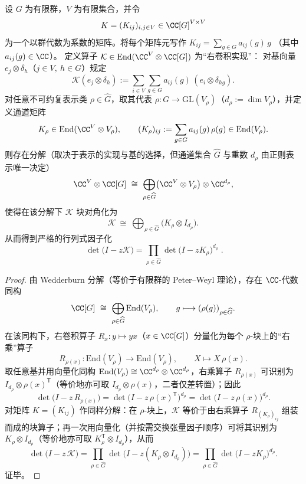 \begin{proposition}\label{prop:kernel-peter-weyl-block-diagonalization}
设 \(G\) 为有限群，\(V\) 为有限集合，并令
\[
K=(K_{ij})_{i,j\in V}\in \CC[G]^{V\times V}
\]
为一个以群代数为系数的矩阵。将每个矩阵元写作
\(
K_{ij}=\sum_{g\in G}a_{ij}(g)\,g
\)
（其中 \(a_{ij}(g)\in\CC\)）。
定义算子 \(\mathcal{K}\in\mathrm{End}(\CC^{V}\otimes\CC[G])\) 为“右卷积实现”：
对基向量 \(e_j\otimes \delta_h\)（\(j\in V,\ h\in G\)）规定
\[
\mathcal{K}(e_j\otimes \delta_h)
:=
\sum_{i\in V}\sum_{g\in G}a_{ij}(g)\,(e_i\otimes\delta_{hg}).
\]
对任意不可约复表示类 \(\rho\in\widehat G\)，取其代表 \(\rho:G\to\mathrm{GL}(V_\rho)\)（\(d_\rho:=\dim V_\rho\)），并定义通道矩阵
\[
K_\rho\in \mathrm{End}(\CC^{V}\otimes V_\rho),
\qquad
(K_\rho)_{ij}:=\sum_{g\in G}a_{ij}(g)\,\rho(g)\in\mathrm{End}(V_\rho).
\]
则存在分解（取决于表示的实现与基的选择，但通道集合 \(\widehat G\) 与重数 \(d_\rho\) 由正则表示唯一决定）
\[
\CC^{V}\otimes\CC[G]
\ \cong\
\bigoplus_{\rho\in\widehat G}\bigl(\CC^{V}\otimes V_\rho\bigr)\otimes \CC^{d_\rho},
\]
使得在该分解下 \(\mathcal{K}\) 块对角化为
\[
\mathcal{K}\ \cong\ \bigoplus_{\rho\in\widehat G}\bigl(K_\rho\otimes I_{d_\rho}\bigr).
\]
从而得到严格的行列式因子化
\[
\boxed{\;
\det\!\bigl(I-z\mathcal{K}\bigr)
=\prod_{\rho\in\widehat G}\det\!\bigl(I-zK_\rho\bigr)^{d_\rho}\; }.
\]
\end{proposition}

\begin{proof}
由 Wedderburn 分解（等价于有限群的 Peter--Weyl 理论），存在 \(\CC\)-代数同构
\[
\CC[G]\ \cong\ \bigoplus_{\rho\in\widehat G}\mathrm{End}(V_\rho),
\qquad
g\longmapsto (\rho(g))_{\rho\in\widehat G}.
\]
在该同构下，右卷积算子 \(R_x:y\mapsto yx\)（\(x\in\CC[G]\)）分量化为每个 \(\rho\)-块上的“右乘”算子
\[
R_{\rho(x)}:\mathrm{End}(V_\rho)\to\mathrm{End}(V_\rho),\qquad X\longmapsto X\,\rho(x).
\]
取任意基并用向量化同构 \(\mathrm{End}(V_\rho)\cong \CC^{d_\rho}\otimes\CC^{d_\rho}\)，右乘算子 \(R_{\rho(x)}\) 可识别为 \(I_{d_\rho}\otimes \rho(x)^{\mathsf T}\)（等价地亦可取 \(I_{d_\rho}\otimes\rho(x)\)，二者仅差转置）；因此
\[
\det\!\bigl(I-z\,R_{\rho(x)}\bigr)
=\det\!\bigl(I-z\,\rho(x)^{\mathsf T}\bigr)^{d_\rho}
=\det\!\bigl(I-z\,\rho(x)\bigr)^{d_\rho}.
\]
对矩阵 \(K=(K_{ij})\) 作同样分解：在 \(\rho\)-块上，\(\mathcal{K}\) 等价于由右乘算子 \(R_{(K_\rho)_{ij}}\) 组装而成的块算子；再一次用向量化（并按需交换张量因子顺序）可将其识别为 \(K_\rho\otimes I_{d_\rho}\)（等价地亦可取 \(K_\rho^{\mathsf T}\otimes I_{d_\rho}\)），从而
\[
\det\!\bigl(I-z\,\mathcal{K}\bigr)
=\prod_{\rho\in\widehat G}\det\!\bigl(I-z(K_\rho\otimes I_{d_\rho})\bigr)
=\prod_{\rho\in\widehat G}\det\!\bigl(I-zK_\rho\bigr)^{d_\rho}.
\]
证毕。
\end{proof}


